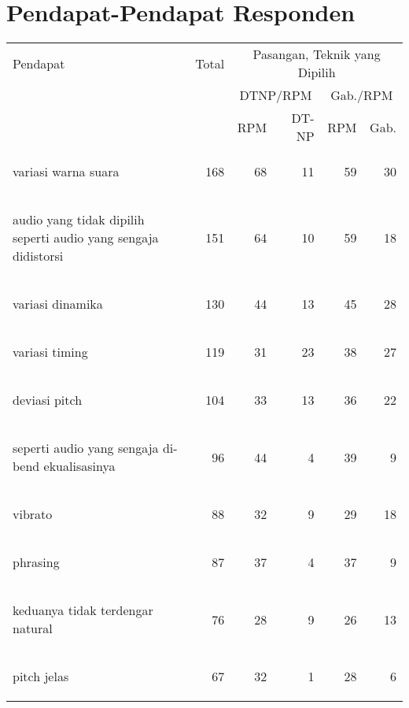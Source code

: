 \chapter{Pendapat-Pendapat Responden}\label{appendix-pendapat}

	\begin{longtable}{|p{}|r|r|r|r|r|}
	\hline
Pendapat&	Total&	\multicolumn{4}{|c|}{Pasangan, Teknik yang Dipilih}\\
\cline{3-6}
&	&	\multicolumn{2}{|c|}{DTNP/RPM}	&\multicolumn{2}{|c|}{Gab./RPM}\\
\cline{3-6}
&	&	RPM&	DT-NP&	RPM&	Gab.\\\hline
\endhead
\begin{intabquote}variasi warna suara\end{intabquote}&	168&	68&	11&	59&	30\\\hline
\begin{intabquote}audio yang tidak dipilih seperti audio yang sengaja didistorsi\end{intabquote}&	151&	64&	10&	59&	18\\\hline
\begin{intabquote}variasi dinamika\end{intabquote}&	130&	44&	13&	45&	28\\\hline
\begin{intabquote}variasi timing\end{intabquote}&	119&	31&	23&	38&	27\\\hline
\begin{intabquote}deviasi pitch\end{intabquote}&	104&	33&	13&	36&	22\\\hline
\begin{intabquote}seperti audio yang sengaja di-bend ekualisasinya\end{intabquote}&	96&	44&	4&	39&	9\\\hline
\begin{intabquote}vibrato\end{intabquote}&	88&	32&	9&	29&	18\\\hline
\begin{intabquote}phrasing\end{intabquote}&	87&	37&	4&	37&	9\\\hline
\begin{intabquote}keduanya tidak terdengar natural\end{intabquote}&	76&	28&	9&	26&	13\\\hline
\begin{intabquote}pitch jelas\end{intabquote}&	67&	32&	1&	28&	6\\\hline

\end{longtable}
